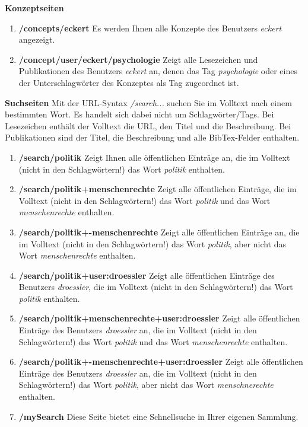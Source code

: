 \documentclass[b5paper,11pt,twoside]{scrbook} %
\begin{document}
\textbf{Konzeptseiten}
\begin{enumerate}
    \item \textbf{/concepts/eckert} \newline
    Es werden Ihnen alle Konzepte des Benutzers \textit{eckert} angezeigt.
    \item \textbf{/concept/user/eckert/psychologie} \newline
    Zeigt alle Lesezeichen und Publikationen des Benutzers \textit{eckert} an, denen das Tag \textit{psychologie} oder eines der Unterschlagwörter des Konzeptes als Tag zugeordnet ist. 
\end{enumerate}
\textbf{Suchseiten}\newline
Mit der URL-Syntax \textit{/search...} suchen Sie im Volltext nach einem bestimmten Wort. Es handelt sich dabei nicht um Schlagwörter/Tags. Bei Lesezeichen enthält der Volltext die URL, den Titel und die Beschreibung. Bei Publikationen sind der Titel, die Beschreibung und alle BibTex-Felder enthalten.
\begin{enumerate}
    \item \textbf{/search/politik} \newline
    Zeigt Ihnen alle öffentlichen Einträge an, die im Volltext (nicht in den Schlagwörtern!) das Wort \textit{politik} enthalten. 
    \item \textbf{/search/politik+menschenrechte}\newline
    Zeigt alle öffentlichen Einträge, die im Volltext (nicht in den Schlagwörtern!) das Wort \textit{politik} und das Wort \textit{menschenrechte} enthalten. 
    \item \textbf{/search/politik+-menschenrechte} \newline
    Zeigt alle öffentlichen Einträge an, die im Volltext (nicht in den Schlagwörtern!) das Wort \textit{politik}, aber nicht das Wort \textit{menschenrechte} enthalten. 
    \item \textbf{/search/politik+user:droessler} \newline
    Zeigt alle öffentlichen Einträge des Benutzers \textit{droessler}, die im Volltext (nicht in den Schlagwörtern!) das Wort \textit{politik} enthalten. 
    \item \textbf{/search/politik+menschenrechte+user:droessler}\newline
    Zeigt alle öffentlichen Einträge des Benutzers \textit{droessler} an, die im Volltext (nicht in den Schlagwörtern!) das Wort \textit{politik} und das Wort \textit{menschenrechte} enthalten. 
    \item \textbf{/search/politik+-menschenrechte+user:droessler} \newline
    Zeigt alle öffentlichen Einträge des Benutzers \textit{droessler} an, die im Volltext (nicht in den Schlagwörtern!) das Wort \textit{politik}, aber nicht das Wort \textit{menschnerechte} enthalten. 
    \item \textbf{/mySearch} \newline
    Diese Seite bietet eine Schnellsuche in Ihrer eigenen Sammlung.
\end{enumerate}
\end{document}
